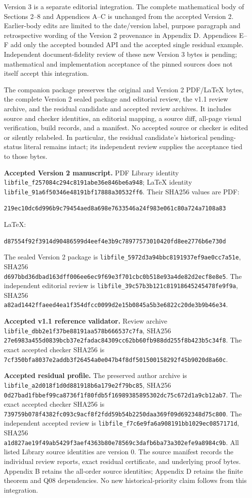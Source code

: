 \documentclass[
  11pt,
]{article}
\begin{document}
Version 3 is a separate editorial integration. The complete mathematical
body of Sections 2--8 and Appendices A--C is unchanged from the accepted
Version 2. Earlier-body edits are limited to the date/version label,
purpose paragraph and retrospective
wording of the Version 2 provenance in Appendix D. Appendices E--F add only
the accepted bounded API and the accepted single residual example.
Independent document-fidelity review of these new Version 3 bytes is
pending; mathematical and implementation acceptance of the pinned sources
does not itself accept this integration.

The companion package preserves the original and Version 2 PDF/LaTeX bytes,
the complete Version 2 sealed package and editorial review, the v1.1
review archive, and the residual candidate and accepted review archives.
It includes source and checker identities, an editorial mapping, a source
diff, all-page visual verification, build records, and a manifest. No
accepted source or checker is edited or silently relabeled. In particular,
the residual candidate's historical pending-status literal remains intact;
its independent review supplies the acceptance tied to those bytes.

\textbf{Accepted Version 2 manuscript.} PDF Library identity
\nolinkurl{libfile_f257084c294c8191abe36e846be6a948}; LaTeX identity
\nolinkurl{libfile_91a6f50346e48191bf17888a30532ff6}. Their SHA256 values are
PDF:

\nolinkurl{219ec10dc6d996b9c79454aed8a698e7633546a24f983e061c80a724a7108a83}

LaTeX:

\nolinkurl{d87554f92f3914d90486599d4eef4e3b9c78977573010420fd8ee2776b6e730d}

The sealed Version 2 package is
\nolinkurl{libfile_5972d3a94bbc8191937ef9ae0cc7a51e}, SHA256
\nolinkurl{d697bbd36dbad163dff006ee6ec9f69e3f701cbc0b518e93a4de82d2ecf8e8e5}.
The independent editorial review is
\nolinkurl{libfile_39c57b3b121c81918645245478fe9f9a}, SHA256
\nolinkurl{a82ad1442ffaeed4ea1f354dfcc0099d2e15b0845a5b3e6822c20de3b9b46e34}.

\textbf{Accepted v1.1 reference validator.} Review archive
\nolinkurl{libfile_dbb2e1f37be88191aa578b666537c7fa}, SHA256
\nolinkurl{27e6983a455d0839bcb37e2fadac84309cc62bb60fb988dd255f8b423b5c34f8}.
The exact accepted checker SHA256 is
\nolinkurl{7cf350bfa8037e2addb3f26454a0e047b4f8df501500158292f45b9020d8a60c}.

\textbf{Accepted residual profile.} The preserved author archive is
\nolinkurl{libfile_a2d018f1d0d881918b6a179e2f79bc85}, SHA256
\nolinkurl{0d27bad1fbbef99ca8736f1f80fdb5f16989385895302dc75c672d1a9cb12ab7}.
The exact accepted checker SHA256 is
\nolinkurl{739759b078f4382fc093c9acf8f2fdd59b54b2250daa369f09d692348d75c800}.
The independent accepted review is
\nolinkurl{libfile_f7c6e9fa6a908191bb1029ec0857171d}, SHA256
\nolinkurl{a1d827ae19f49ab5429f3aef4363b80e78569c3dafb6ba73a302efe9a8984c9b}.
All listed Library source identities are version 0. The source manifest
records the individual review reports, exact residual certificate, and
underlying proof bytes. Appendix B retains the all-order source identities;
Appendix D retains the finite theorem and Q08 dependencies. No new
historical-priority claim follows from this integration.
\end{document}
